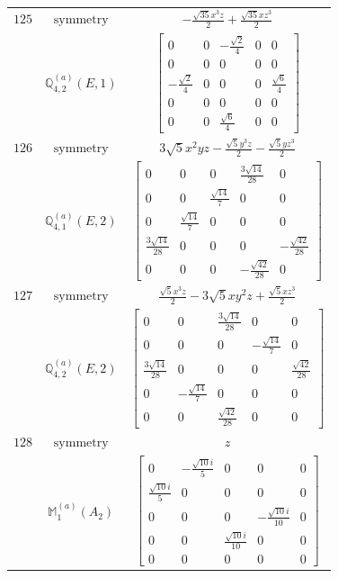 \documentclass[fleqn,8pt,landscape]{jsarticle}
\begin{document}
\begin{longtable}{ccc}
$ 125 $ & $ \text{symmetry} $ & $ - \frac{\sqrt{35} x^{3} z}{2} + \frac{\sqrt{35} x z^{3}}{2} $ \\
$  $ & $ \mathbb{Q}_{4,2}^{(a)}(E,1) $ & $ \begin{bmatrix} 0 & 0 & - \frac{\sqrt{2}}{4} & 0 & 0 \\ 0 & 0 & 0 & 0 & 0 \\ - \frac{\sqrt{2}}{4} & 0 & 0 & 0 & \frac{\sqrt{6}}{4} \\ 0 & 0 & 0 & 0 & 0 \\ 0 & 0 & \frac{\sqrt{6}}{4} & 0 & 0 \end{bmatrix} $ \\ \hline
$ 126 $ & $ \text{symmetry} $ & $ 3 \sqrt{5} x^{2} y z - \frac{\sqrt{5} y^{3} z}{2} - \frac{\sqrt{5} y z^{3}}{2} $ \\
$  $ & $ \mathbb{Q}_{4,1}^{(a)}(E,2) $ & $ \begin{bmatrix} 0 & 0 & 0 & \frac{3 \sqrt{14}}{28} & 0 \\ 0 & 0 & \frac{\sqrt{14}}{7} & 0 & 0 \\ 0 & \frac{\sqrt{14}}{7} & 0 & 0 & 0 \\ \frac{3 \sqrt{14}}{28} & 0 & 0 & 0 & - \frac{\sqrt{42}}{28} \\ 0 & 0 & 0 & - \frac{\sqrt{42}}{28} & 0 \end{bmatrix} $ \\ \hline
$ 127 $ & $ \text{symmetry} $ & $ \frac{\sqrt{5} x^{3} z}{2} - 3 \sqrt{5} x y^{2} z + \frac{\sqrt{5} x z^{3}}{2} $ \\
$  $ & $ \mathbb{Q}_{4,2}^{(a)}(E,2) $ & $ \begin{bmatrix} 0 & 0 & \frac{3 \sqrt{14}}{28} & 0 & 0 \\ 0 & 0 & 0 & - \frac{\sqrt{14}}{7} & 0 \\ \frac{3 \sqrt{14}}{28} & 0 & 0 & 0 & \frac{\sqrt{42}}{28} \\ 0 & - \frac{\sqrt{14}}{7} & 0 & 0 & 0 \\ 0 & 0 & \frac{\sqrt{42}}{28} & 0 & 0 \end{bmatrix} $ \\ \hline
$ 128 $ & $ \text{symmetry} $ & $ z $ \\
$  $ & $ \mathbb{M}_{1}^{(a)}(A_{2}) $ & $ \begin{bmatrix} 0 & - \frac{\sqrt{10} i}{5} & 0 & 0 & 0 \\ \frac{\sqrt{10} i}{5} & 0 & 0 & 0 & 0 \\ 0 & 0 & 0 & - \frac{\sqrt{10} i}{10} & 0 \\ 0 & 0 & \frac{\sqrt{10} i}{10} & 0 & 0 \\ 0 & 0 & 0 & 0 & 0 \end{bmatrix} $ \\ \hline

\end{longtable}
\end{document}
